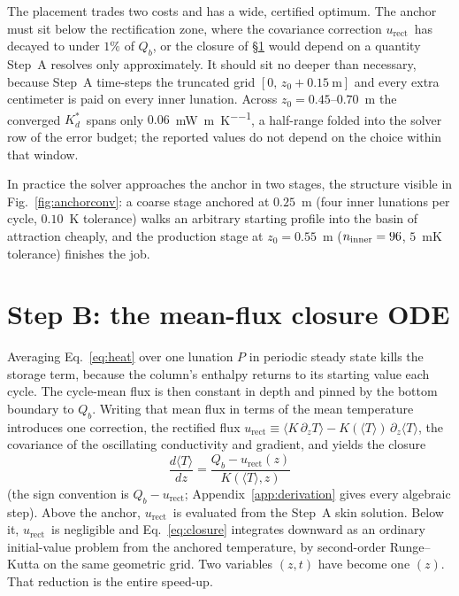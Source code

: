 \documentclass[11pt,a4paper,oneside]{report}
\newcommand{\Kds}{\ensuremath{K_d^{*}}}
\newcommand{\Qb}{\ensuremath{Q_b}}
\newcommand{\Tm}{\ensuremath{\langle T\rangle}}
\newcommand{\urect}{\ensuremath{u_{\mathrm{rect}}}}
\newcommand{\mWmK}{\si{\milli\watt\per\meter\per\kelvin}}
\begin{document}
The placement trades two costs and has a wide, certified optimum. The
anchor must sit below the rectification zone, where the covariance
correction \urect\ has decayed to under $1\%$ of \Qb, or the closure
of \S\ref{sec:closure} would depend on a quantity Step~A resolves
only approximately. It should sit no deeper than necessary, because
Step~A time-steps the truncated grid $[0,\,z_0+0.15~\mathrm{m}]$ and
every extra centimeter is paid on every inner lunation. Across
$z_0=0.45$--$0.70$~m the converged \Kds\ spans only $0.06$~\mWmK, a
half-range folded into the solver row of the error budget; the
reported values do not depend on the choice within that window.

In practice the solver approaches the anchor in two stages, the
structure visible in Fig.~\ref{fig:anchorconv}: a coarse stage
anchored at $0.25$~m (four inner lunations per cycle, $0.10$~K
tolerance) walks an arbitrary starting profile into the basin of
attraction cheaply, and the production stage at $z_0=0.55$~m
($n_{\rm inner}=96$, $5$~mK tolerance) finishes the job.

\section{Step B: the mean-flux closure ODE}\label{sec:closure}
Averaging Eq.~\eqref{eq:heat} over one lunation $P$ in periodic
steady state kills the storage term, because the column's enthalpy
returns to its starting value each cycle. The cycle-mean flux is then
constant in depth and pinned by the bottom boundary to \Qb. Writing
that mean flux in terms of the mean temperature introduces one
correction, the rectified flux
$\urect \equiv \langle K\,\partial_z T\rangle -
K(\Tm)\,\partial_z\Tm$, the covariance of the oscillating
conductivity and gradient, and yields the closure
\begin{equation}
  \boxed{\;\frac{d\Tm}{dz} = \frac{\Qb - \urect(z)}{K(\Tm, z)}\;}
  \label{eq:closure}
\end{equation}
(the sign convention is $\Qb-\urect$; Appendix~\ref{app:derivation}
gives every algebraic step). Above the anchor, \urect\ is evaluated
from the Step~A skin solution. Below it, \urect\ is negligible and
Eq.~\eqref{eq:closure} integrates downward as an ordinary
initial-value problem from the anchored temperature, by second-order
Runge--Kutta on the same geometric grid. Two variables $(z,t)$ have
become one $(z)$. That reduction is the entire speed-up.
\end{document}
